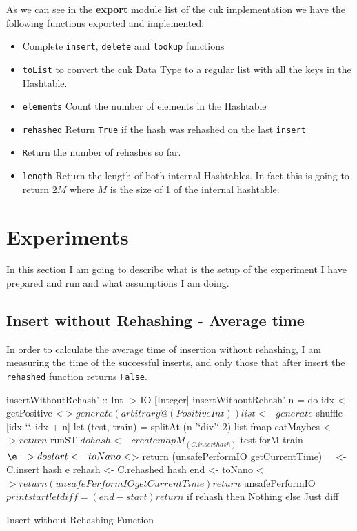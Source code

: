 \documentclass[12pt, a4paper]{article}
\begin{document}
As we can see in the \textbf{export} module list of the \acrshort{cuk} implementation we have the following functions exported and implemented:

\begin{itemize}
  \item Complete \texttt{insert}, \texttt{delete} and \texttt{lookup} functions
  \item \texttt{toList} to convert the \acrshort{cuk} Data Type to a regular list with all the keys in the Hashtable.
  \item \texttt{elements} Count the number of elements in the Hashtable
  \item \texttt{rehashed} Return \texttt{True} if the hash was rehashed on the last \texttt{insert}
  \item \texttt Return the number of rehashes so far.
  \item \texttt{length} Return the length of both internal Hashtables. In fact this is going to return $2M$ where $M$ is the size of 1 of the internal hashtable.
\end{itemize}

\section{Experiments}
In this section I am going to describe what is the setup of the experiment I have prepared and run and what assumptions I am doing.

\subsection{Insert without Rehashing - Average time}
In order to calculate the average time of insertion without rehashing, I am measuring the time of the successful inserts, and only those that after insert the \texttt{rehashed} function returns \texttt{False}.

\begin{listing}[H]
\begin{haskellcode*}{}
insertWithoutRehash' :: Int -> IO [Integer]
insertWithoutRehash' n = do
  idx <- getPositive <$> generate (arbitrary @(Positive Int))
  list <- generate $ shuffle [idx `.`. idx + n]
  let (test, train) = splitAt (n '`div'` 2) list
  fmap catMaybes <$> return $
    runST $ do
      hash <- create
      mapM_ (C.insert hash) $ test
      forM train $ \e -> do
        start <- toNano <$> return (unsafePerformIO getCurrentTime)
        _ <- C.insert hash e
        rehash <- C.rehashed hash
        end <- toNano <$> return (unsafePerformIO getCurrentTime)
        return $ unsafePerformIO $ print start
        let diff = (end - start)
        return $
          if rehash
            then Nothing
            else Just diff
\end{haskellcode*}
\caption{Insert without Rehashing Function}
\label{lst:insertWithoutRehash}
\end{listing}
\end{document}
